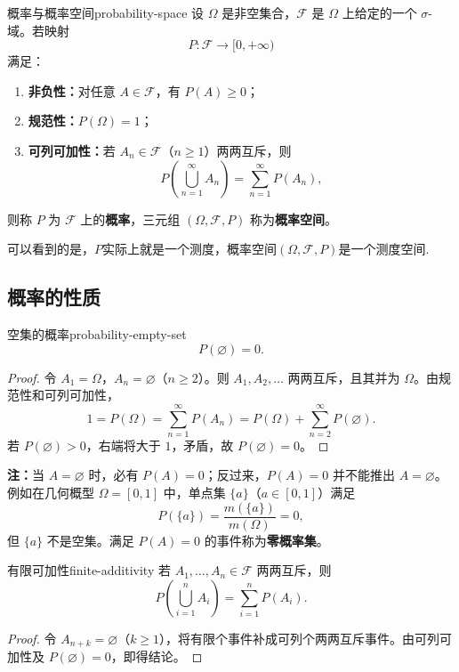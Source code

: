 \begin{mydefinition}{概率与概率空间}{probability-space}
设 $\Omega$ 是非空集合，$\mathscr{F}$ 是 $\Omega$ 上给定的一个 $\sigma$-域。若映射
\[
P:\mathscr{F}\longrightarrow[0,+\infty)
\]
满足：
\begin{enumerate}
\item \textbf{非负性：}对任意 $A\in\mathscr{F}$，有 $P(A)\geq0$；
\item \textbf{规范性：}$P(\Omega)=1$；
\item \textbf{可列可加性：}若 $A_n\in\mathscr{F}$（$n\geq1$）两两互斥，则
\[
P\left(\bigcup_{n=1}^{\infty}A_n\right)
=\sum_{n=1}^{\infty}P(A_n),
\]
\end{enumerate}
则称 $P$ 为 $\mathscr{F}$ 上的\textbf{概率}，三元组 $(\Omega,\mathscr{F},P)$ 称为\textbf{概率空间}。
\end{mydefinition}
可以看到的是，$P$实际上就是一个测度，概率空间$(\Omega,\mathscr{F},P)$是一个测度空间.
\subsection*{概率的性质}
\begin{proposition}{空集的概率}{probability-empty-set}
\[
P(\varnothing)=0.
\]
\end{proposition}

\begin{proof}
令 $A_1=\Omega$，$A_n=\varnothing$（$n\geq2$）。则 $A_1,A_2,\ldots$ 两两互斥，且其并为 $\Omega$。由规范性和可列可加性，
\[
1=P(\Omega)=\sum_{n=1}^{\infty}P(A_n)
=P(\Omega)+\sum_{n=2}^{\infty}P(\varnothing).
\]
若 $P(\varnothing)>0$，右端将大于 $1$，矛盾，故 $P(\varnothing)=0$。
\end{proof}

\textbf{注：}当 $A=\varnothing$ 时，必有 $P(A)=0$；反过来，$P(A)=0$ 并不能推出 $A=\varnothing$。例如在几何概型 $\Omega=[0,1]$ 中，单点集 $\{a\}$（$a\in[0,1]$）满足
\[
P(\{a\})=\dfrac{m(\{a\})}{m(\Omega)}=0,
\]
但 $\{a\}$ 不是空集。满足 $P(A)=0$ 的事件称为\textbf{零概率集}。

\begin{proposition}{有限可加性}{finite-additivity}
若 $A_1,\ldots,A_n\in\mathscr{F}$ 两两互斥，则
\[
P\left(\bigcup_{i=1}^{n}A_i\right)
=\sum_{i=1}^{n}P(A_i).
\]
\end{proposition}

\begin{proof}
令 $A_{n+k}=\varnothing$（$k\geq1$），将有限个事件补成可列个两两互斥事件。由可列可加性及 $P(\varnothing)=0$，即得结论。
\end{proof}

